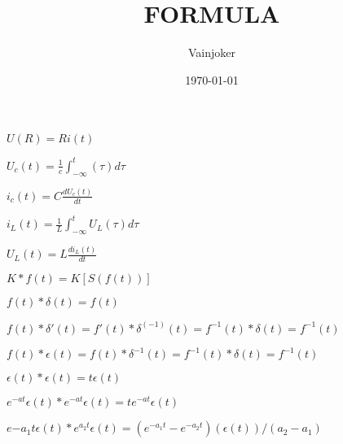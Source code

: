 \documentclass{article}
\title{FORMULA}
\author{Vainjoker}
\date{\today}
\begin{document}
    \maketitle
    \newpage
    
    $U(R)=Ri(t)$

    $U_c(t)=\frac{1}{c}\int^t_{-\infty}(\tau)d\tau$

    $i_{c}(t)=C\frac{dU_{c}(t)}{dt}$

    $i_{L}(t)=\frac{1}{L}\int _{-\infty}^{t}U_{L}(\tau)d\tau$

    $U_{L}(t)=L\frac{di_{L}(t)}{dt}$

    $K*f(t)=K[S(f(t))]$

    $f(t)*\delta(t)=f(t)$

    $f(t)*\delta'(t)=f'(t)*\delta^(-1)(t)=f^{-1}(t)*\delta(t)=f^{-1}(t)$

    $f(t)*\epsilon(t)=f(t)*\delta^{-1}(t)=f^{-1}(t)*\delta(t)=f^{-1}(t)$

    $\epsilon(t)*\epsilon(t)=t\epsilon(t)$

    $e^{-at}\epsilon(t)*e^{-at}\epsilon(t)=te^{-at}\epsilon(t)$

    $e{-a_1t}\epsilon(t)*e^{a_2t}\epsilon(t)=(e^{-a_1t}-e^{-a_2t})(\epsilon(t))/(a_2-a_1)$
\end{document}
